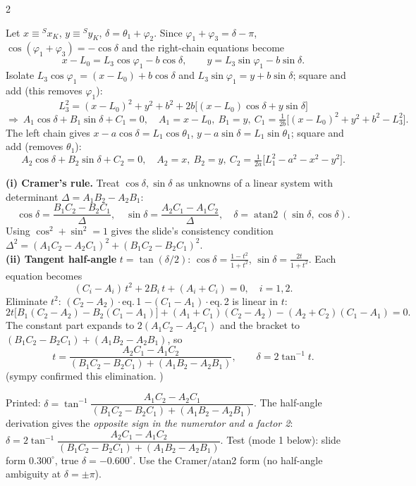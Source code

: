 \begin{multicols}{2}
\begin{deriv}
Let $x\equiv{}^Sx_K$, $y\equiv{}^Sy_K$, $\delta=\theta_1+\varphi_2$. Since $\varphi_1+\varphi_3=\delta-\pi$, $\cos(\varphi_1+\varphi_3)=-\cos\delta$ and the right-chain equations become
\[x-L_0=L_3\cos\varphi_1-b\cos\delta,\qquad y=L_3\sin\varphi_1-b\sin\delta.\]
Isolate $L_3\cos\varphi_1=(x-L_0)+b\cos\delta$ and $L_3\sin\varphi_1=y+b\sin\delta$; square and add (this removes $\varphi_1$):
\[L_3^2=(x-L_0)^2+y^2+b^2+2b\big[(x-L_0)\cos\delta+y\sin\delta\big]\]
\[\Rightarrow\ A_1\cos\delta+B_1\sin\delta+C_1=0,\quad A_1=x-L_0,\ B_1=y,\ C_1=\tfrac1{2b}\big[(x-L_0)^2+y^2+b^2-L_3^2\big].\]
The left chain gives $x-a\cos\delta=L_1\cos\theta_1$, $y-a\sin\delta=L_1\sin\theta_1$; square and add (removes $\theta_1$):
\[A_2\cos\delta+B_2\sin\delta+C_2=0,\quad A_2=x,\ B_2=y,\ C_2=\tfrac1{2a}\big[L_1^2-a^2-x^2-y^2\big].\]
\end{deriv}
\begin{deriv}
\textbf{(i) Cramer's rule.} Treat $\cos\delta,\sin\delta$ as unknowns of a linear system with determinant $\Delta=A_1B_2-A_2B_1$:
\[\cos\delta=\frac{B_1C_2-B_2C_1}{\Delta},\quad\sin\delta=\frac{A_2C_1-A_1C_2}{\Delta},\quad\delta=\operatorname{atan2}(\sin\delta,\cos\delta).\]
Using $\cos^2+\sin^2=1$ gives the slide's consistency condition $\Delta^2=(A_1C_2-A_2C_1)^2+(B_1C_2-B_2C_1)^2$.\\
\textbf{(ii) Tangent half-angle} $t=\tan(\delta/2)$: $\cos\delta=\frac{1-t^2}{1+t^2}$, $\sin\delta=\frac{2t}{1+t^2}$. Each equation becomes
\[(C_i-A_i)\,t^2+2B_i\,t+(A_i+C_i)=0,\quad i=1,2.\]
Eliminate $t^2$: $(C_2-A_2)\cdot$eq.\,1 $-(C_1-A_1)\cdot$eq.\,2 is linear in $t$:
\[2t\big[B_1(C_2-A_2)-B_2(C_1-A_1)\big]+(A_1+C_1)(C_2-A_2)-(A_2+C_2)(C_1-A_1)=0.\]
The constant part expands to $2(A_1C_2-A_2C_1)$ and the bracket to $(B_1C_2-B_2C_1)+(A_1B_2-A_2B_1)$, so
\[t=\frac{A_2C_1-A_1C_2}{(B_1C_2-B_2C_1)+(A_1B_2-A_2B_1)},\qquad\delta=2\tan^{-1}t.\]
(sympy confirmed this elimination. \chk)
\end{deriv}
\begin{slideerr}[slide 65]
Printed: $\delta=\tan^{-1}\dfrac{A_1C_2-A_2C_1}{(B_1C_2-B_2C_1)+(A_1B_2-A_2B_1)}$. The half-angle derivation gives the \emph{opposite sign in the numerator and a factor 2}: $\delta=2\tan^{-1}\dfrac{A_2C_1-A_1C_2}{(B_1C_2-B_2C_1)+(A_1B_2-A_2B_1)}$. Test (mode 1 below): slide form $0.300^\circ$, true $\delta=-0.600^\circ$. Use the Cramer/atan2 form (no half-angle ambiguity at $\delta=\pm\pi$). \chk\\

\end{slideerr}
\end{multicols}
